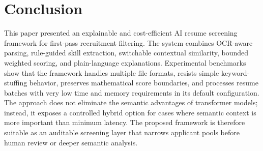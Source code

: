 \section{Conclusion}
This paper presented an explainable and cost-efficient AI resume screening framework for first-pass recruitment filtering. The system combines OCR-aware parsing, rule-guided skill extraction, switchable contextual similarity, bounded weighted scoring, and plain-language explanations. Experimental benchmarks show that the framework handles multiple file formats, resists simple keyword-stuffing behavior, preserves mathematical score boundaries, and processes resume batches with very low time and memory requirements in its default configuration. The approach does not eliminate the semantic advantages of transformer models; instead, it exposes a controlled hybrid option for cases where semantic context is more important than minimum latency. The proposed framework is therefore suitable as an auditable screening layer that narrows applicant pools before human review or deeper semantic analysis.
